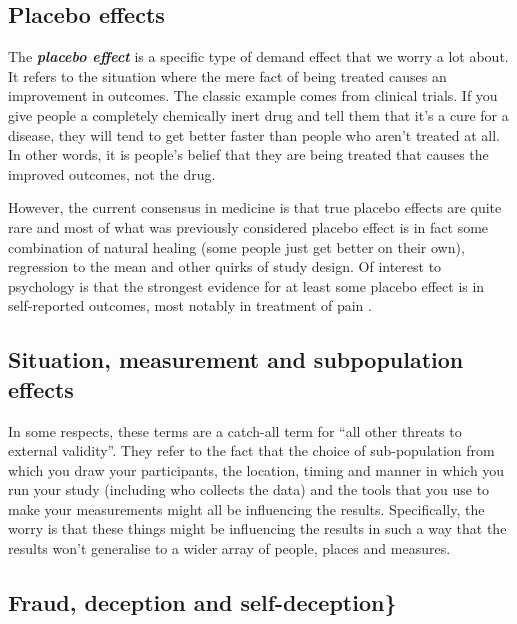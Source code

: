 \documentclass[
]{book}
\begin{document}
\hypertarget{placebo-effects}{%
\subsection{Placebo effects}\label{placebo-effects}}

The \textbf{\emph{placebo effect}} is a specific type of demand effect that we worry a lot about. It refers to the situation where the mere fact of being treated causes an improvement in outcomes. The classic example comes from clinical trials. If you give people a completely chemically inert drug and tell them that it's a cure for a disease, they will tend to get better faster than people who aren't treated at all. In other words, it is people's belief that they are being treated that causes the improved outcomes, not the drug.

However, the current consensus in medicine is that true placebo effects are quite rare and most of what was previously considered placebo effect is in fact some combination of natural healing (some people just get better on their own), regression to the mean and other quirks of study design. Of interest to psychology is that the strongest evidence for at least some placebo effect is in self-reported outcomes, most notably in treatment of pain \citep{hrobjartsson2010}.

\hypertarget{situation-measurement-and-subpopulation-effects}{%
\subsection{Situation, measurement and subpopulation effects}\label{situation-measurement-and-subpopulation-effects}}

In some respects, these terms are a catch-all term for ``all other threats to external validity''. They refer to the fact that the choice of sub-population from which you draw your participants, the location, timing and manner in which you run your study (including who collects the data) and the tools that you use to make your measurements might all be influencing the results. Specifically, the worry is that these things might be influencing the results in such a way that the results won't generalise to a wider array of people, places and measures.

\hypertarget{fraud-deception-and-self-deception}{%
\subsection{Fraud, deception and self-deception\}}\label{fraud-deception-and-self-deception}}
\end{document}
